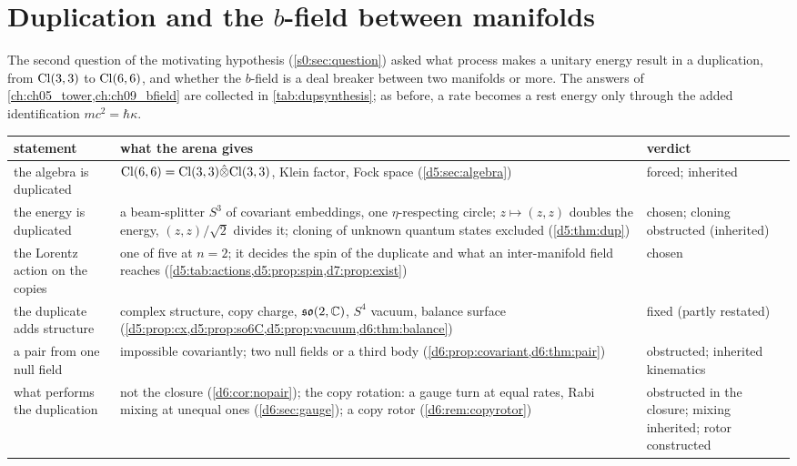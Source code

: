 \section{Duplication and the \texorpdfstring{$b$}{b}-field between manifolds}
\label{sec:dupsynthesis}
\label{s6:sec:synthesis}

The second question of the motivating hypothesis (\cref{s0:sec:question}) asked what process makes a unitary energy result in a duplication,
from $\mathrm{Cl}(3,3)$ to $\mathrm{Cl}(6,6)$, and whether the $b$-field is a deal breaker between two manifolds or more. The answers of
\cref{ch:ch05_tower,ch:ch09_bfield} are collected in \cref{tab:dupsynthesis}; as before, a rate becomes a rest energy only through the added
identification $mc^2=\hbar\kappa$.

\begin{table}[t]
\centering
\footnotesize
\begin{tabular}{@{}>{\raggedright\arraybackslash}p{3.6cm}>{\raggedright\arraybackslash}p{7.4cm}>{\raggedright\arraybackslash}p{3.4cm}@{}}
\toprule
statement & what the arena gives & verdict\\
\midrule
the algebra is duplicated & $\mathrm{Cl}(6,6)=\mathrm{Cl}(3,3)\hat\otimes\mathrm{Cl}(3,3)$, Klein factor, Fock space (\cref{d5:sec:algebra}) & forced; inherited\\
the energy is duplicated & a beam-splitter $S^3$ of covariant embeddings, one $\eta$-respecting circle; $z\mapsto(z,z)$ doubles the energy, $(z,z)/\sqrt2$ divides it; cloning of unknown quantum states excluded (\cref{d5:thm:dup}) & chosen; cloning obstructed (inherited)\\
the Lorentz action on the copies & one of five at $n=2$; it decides the spin of the duplicate and what an inter-manifold field reaches (\cref{d5:tab:actions,d5:prop:spin,d7:prop:exist}) & chosen\\
the duplicate adds structure & complex structure, copy charge, $\mathfrak{so}(2,\mathbb{C})$, $S^4$ vacuum, balance surface (\cref{d5:prop:cx,d5:prop:so6C,d5:prop:vacuum,d6:thm:balance}) & fixed (partly restated)\\
a pair from one null field & impossible covariantly; two null fields or a third body (\cref{d6:prop:covariant,d6:thm:pair}) & obstructed; inherited kinematics\\
what performs the duplication & not the closure (\cref{d6:cor:nopair}); the copy rotation: a gauge turn at equal rates, Rabi mixing at unequal ones (\cref{d6:sec:gauge}); a copy rotor (\cref{d6:rem:copyrotor}) & obstructed in the closure; mixing inherited; rotor constructed\\

\end{tabular}
\end{table}
